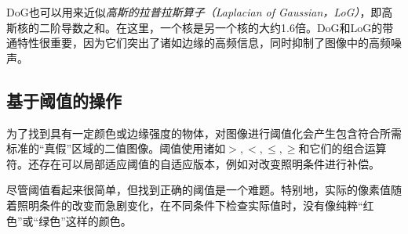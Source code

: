 
DoG也可以用来近似\emph{高斯的拉普拉斯算子（Laplacian of Gaussian，LoG）}，即高斯核的二阶导数之和。在这里，一个核是另一个核的大约1.6倍。DoG和LoG的带通特性很重要，因为它们突出了诸如边缘的高频信息，同时抑制了图像中的高频噪声。


\subsection{基于阈值的操作}
为了找到具有一定颜色或边缘强度的物体，对图像进行阈值化会产生包含符合所需标准的“真假”区域的二值图像。阈值使用诸如$>,<,\leq,\geq$和它们的组合运算符。还存在可以局部适应阈值的自适应版本，例如对改变照明条件进行补偿。


尽管阈值看起来很简单，但找到正确的阈值是一个难题。特别地，实际的像素值随着照明条件的改变而急剧变化，在不同条件下检查实际值时，没有像纯粹“红色”或“绿色”这样的颜色。


